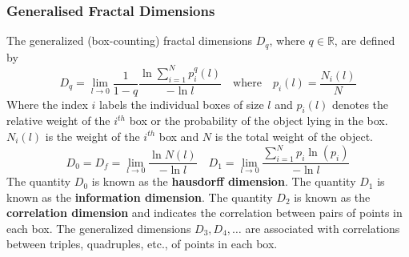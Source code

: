 \subsubsection{Generalised Fractal Dimensions}
The generalized (box-counting) fractal dimensions $D_q$, where $q\in\mathbb{R}$, are defined by
\begin{equation}
	D_q=\lim_{l\rightarrow0}\frac{1}{1-q}\frac{\ln\sum\limits_{i=1}^Np_i^q(l)}{-\ln l}\quad\text{where}\quad p_i(l)=\frac{N_i(l)}{N}
\end{equation}
Where the index $i$ labels the individual boxes of size $l$ and $p_i(l)$ denotes the relative weight of the $i^{th}$ box or the probability of the object lying in the box.
$N_i(l)$ is the weight of the $i^{th}$ box and $N$ is the total weight of the object.
\begin{equation}
	D_0=D_f=\lim_{l\rightarrow0}\frac{\ln N(l)}{-\ln l}\quad
	D_1=\lim_{l\rightarrow0}\frac{\sum\limits_{i=1}^Np_i\ln(p_i)}{-\ln l}
\end{equation}
The quantity $D_0$ is known as the \textbf{hausdorff dimension}.
The quantity $D_1$ is known as the \textbf{information dimension}.
The quantity $D_2$ is known as the \textbf{correlation dimension} and indicates the correlation between pairs of points in each box.
The generalized dimensions $D_3,D_4,\ldots$ are associated with correlations between triples, quadruples, etc., of points in each box.
